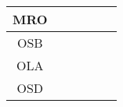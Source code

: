 \documentclass[a4paper,12pt]{article}
\begin{document}
\begin{tabular}{|c|c|c|c|c|c|}
        MRO&\cellcolor[HTML]{984EA3}&\cellcolor[HTML]{984EA3}&\cellcolor[HTML]{984EA3}&\cellcolor[HTML]{984EA3}&\cellcolor[HTML]{984EA3}\\ \hline %
        OSB&\cellcolor[HTML]{FF7F00}&\cellcolor[HTML]{FF7F00}&\cellcolor[HTML]{FF7F00}&\cellcolor[HTML]{FF7F00}&\cellcolor[HTML]{FF7F00}\\ \hline %
        OLA&\cellcolor[HTML]{FF7F00}&\cellcolor[HTML]{FFFF33}&\cellcolor[HTML]{FF7F00}&\cellcolor[HTML]{FFFF33}&\cellcolor[HTML]{FF7F00}\\ \hline %
        OSD&\cellcolor[HTML]{FF7F00}&\cellcolor[HTML]{FFFF33}&\cellcolor[HTML]{FFFF33}&\cellcolor[HTML]{A65628}&\cellcolor[HTML]{FFFF33}\\ \hline %
\end{tabular}
\end{document}
